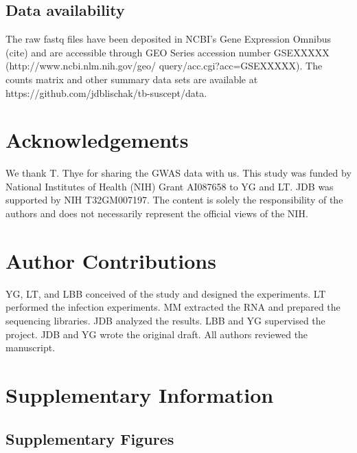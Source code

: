 \documentclass[fleqn,10pt]{wlscirep}
\newcommand{\beginsupplement}{%
 \setcounter{table}{0}
 \renewcommand{\thetable}{S\arabic{table}}%
 \setcounter{figure}{0}
 \renewcommand{\thefigure}{S\arabic{figure}}%
 }
\begin{document}
\subsection*{Data availability}

The raw fastq files have been deposited in NCBI's Gene Expression
Omnibus (cite) and are accessible through GEO Series accession number
GSEXXXXX (http://www.ncbi.nlm.nih.gov/geo/
query/acc.cgi?acc=GSEXXXXX). The counts matrix and other summary data
sets are available at https://github.com/jdblischak/tb-suscept/data.
\section*{Acknowledgements}

We thank T. Thye for sharing the GWAS data with us. This study was
funded by National Institutes of Health (NIH) Grant AI087658 to YG and
LT. JDB was supported by NIH T32GM007197. The content is solely the
responsibility of the authors and does not necessarily represent the
official views of the NIH.
\section*{Author Contributions}

YG, LT, and LBB conceived of the study and designed the experiments.
LT performed the infection experiments. MM extracted the RNA and
prepared the sequencing libraries. JDB analyzed the results. LBB and
YG supervised the project. JDB and YG wrote the original draft. All
authors reviewed the manuscript.



\clearpage\newpage
\beginsupplement
\section*{Supplementary Information}

\subsection*{Supplementary Figures}
\end{document}
